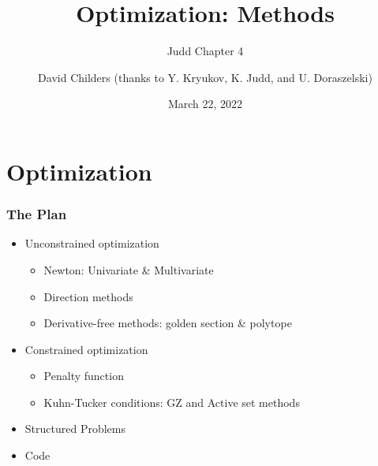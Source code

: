 \documentclass[bigger]{beamer}
\begin{document}
\title[47-805: Optimization]{Optimization: Methods}
\subtitle{Judd Chapter 4}
\author[David Childers]{David Childers (thanks to Y. Kryukov, K. Judd, and U. Doraszelski)}
\date[Mar-22]{March 22, 2022}
\maketitle

\section{Optimization}

\begin{frame}%

\frametitle{The Plan}

\begin{itemize}
\item Unconstrained optimization

\begin{itemize}
\item Newton: Univariate \& Multivariate

\item Direction methods

\item Derivative-free methods: golden section \& polytope
\end{itemize}

\item Constrained optimization

\begin{itemize}
\item Penalty function

\item Kuhn-Tucker conditions: \newline
GZ and Active set methods
\end{itemize}

\item Structured Problems

\item Code
\end{itemize}

\end{frame}%
\end{document}

